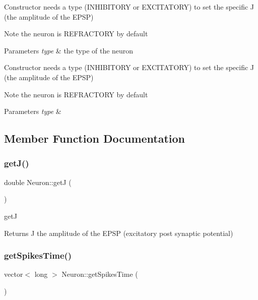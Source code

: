 Constructor needs a type (I\+N\+H\+I\+B\+I\+T\+O\+RY or E\+X\+C\+I\+T\+A\+T\+O\+RY) to set the specific J (the amplitude of the E\+P\+SP) \begin{DoxyNote}{Note}
the neuron is R\+E\+F\+R\+A\+C\+T\+O\+RY by default 
\end{DoxyNote}

\begin{DoxyParams}{Parameters}
{\em type} & the type of the neuron\\
\hline
\end{DoxyParams}
Constructor needs a type (I\+N\+H\+I\+B\+I\+T\+O\+RY or E\+X\+C\+I\+T\+A\+T\+O\+RY) to set the specific J (the amplitude of the E\+P\+SP) \begin{DoxyNote}{Note}
the neuron is R\+E\+F\+R\+A\+C\+T\+O\+RY by default 
\end{DoxyNote}

\begin{DoxyParams}{Parameters}
{\em type} & \\
\hline
\end{DoxyParams}


\subsection{Member Function Documentation}
\mbox{\label{class_neuron_a785e7e450147879ffd9e4ba385f870b0}} 
\subsubsection{\texorpdfstring{get\+J()}{getJ()}}
{\footnotesize\ttfamily double Neuron\+::getJ (\begin{DoxyParamCaption}{ }\end{DoxyParamCaption})}

getJ \begin{DoxyReturn}{Returns}
J the amplitude of the E\+P\+SP (excitatory post synaptic potential) 
\end{DoxyReturn}
\mbox{\label{class_neuron_a34710c23e78097abdad63ff0abc544d8}} 
\subsubsection{\texorpdfstring{get\+Spikes\+Time()}{getSpikesTime()}}
{\footnotesize\ttfamily vector$<$ long $>$ Neuron\+::get\+Spikes\+Time (\begin{DoxyParamCaption}{ }\end{DoxyParamCaption})}

